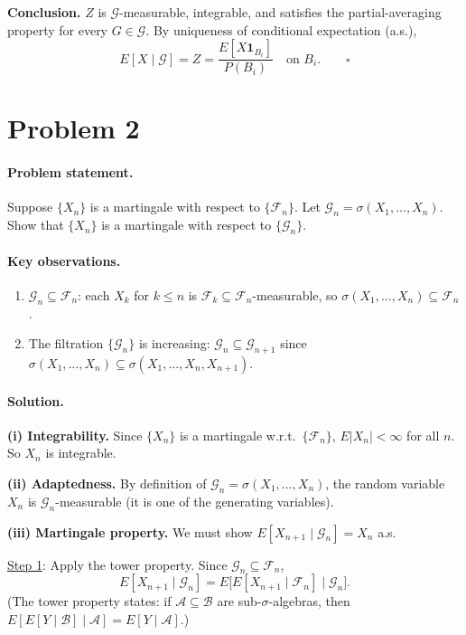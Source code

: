 \documentclass[11pt]{article}
\newcommand{\F}{\mathcal{F}}
\newcommand{\G}{\mathcal{G}}
\newcommand{\1}{\mathbf{1}}
\theoremstyle{plain}
\begin{document}
\textbf{Conclusion.}
$Z$ is $\G$-measurable, integrable, and satisfies the partial-averaging property
for every $G\in\G$. By uniqueness of conditional expectation (a.s.),
\[
  E[X\mid\G] = Z = \frac{E[X\mathbf{1}_{B_i}]}{P(B_i)}\quad\text{on }B_i.
  \qquad\square
\]

\section*{Problem 2}

\paragraph{Problem statement.}
Suppose $\{X_n\}$ is a martingale with respect to $\{\F_n\}$. Let
$\G_n=\sigma(X_1,\ldots,X_n)$. Show that $\{X_n\}$ is a martingale with
respect to $\{\G_n\}$.

\paragraph{Key observations.}
\begin{enumerate}
  \item $\G_n\subseteq\F_n$: each $X_k$ for $k\le n$ is $\F_k\subseteq\F_n$-measurable,
        so $\sigma(X_1,\ldots,X_n)\subseteq\F_n$.
  \item The filtration $\{\G_n\}$ is increasing: $\G_n\subseteq\G_{n+1}$ since
        $\sigma(X_1,\ldots,X_n)\subseteq\sigma(X_1,\ldots,X_n,X_{n+1})$.
\end{enumerate}

\paragraph{Solution.}

\textbf{(i) Integrability.} Since $\{X_n\}$ is a martingale w.r.t.\ $\{\F_n\}$,
$E|X_n|<\infty$ for all $n$. So $X_n$ is integrable.

\textbf{(ii) Adaptedness.} By definition of $\G_n=\sigma(X_1,\ldots,X_n)$, the
random variable $X_n$ is $\G_n$-measurable (it is one of the generating variables).

\textbf{(iii) Martingale property.}
We must show $E[X_{n+1}\mid\G_n]=X_n$ a.s.

\underline{Step 1}: Apply the tower property. Since $\G_n\subseteq\F_n$,
\[
  E[X_{n+1}\mid\G_n]
  = E\!\bigl[E[X_{n+1}\mid\F_n]\mid\G_n\bigr].
\]
(The tower property states: if $\mathcal{A}\subseteq\mathcal{B}$ are
sub-$\sigma$-algebras, then $E[E[Y\mid\mathcal{B}]\mid\mathcal{A}]
=E[Y\mid\mathcal{A}]$.)
\end{document}
